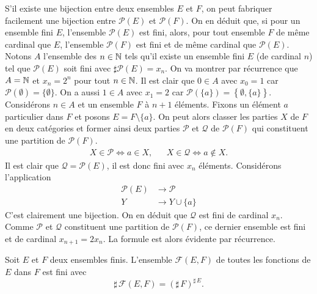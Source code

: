 \begin{demo}
 S'il existe une bijection entre deux ensembles $E$ et $F$, on peut fabriquer facilement une bijection entre $\mathcal{P}(E)$ et $\mathcal{P}(F)$. On en déduit que, si pour un ensemble fini $E$, l'ensemble $\mathcal{P}(E)$ est fini, alors, pour tout ensemble $F$ de même cardinal que $E$, l'ensemble $\mathcal{P}(F)$ est fini et de même cardinal que $\mathcal{P}(E)$.\newline
Notons $A$ l'ensemble des $n\in \mathbb{N}$ tels qu'il existe un ensemble fini $E$ (de cardinal $n$) tel que $\mathcal{P}(E)$ soit fini avec $\sharp \mathcal{P}(E) = x_n$.\newline
On va montrer par récurrence que $A=\mathbb{N}$ et $x_n=2^n$ pour tout $n\in \mathbb{N}$.\newline
Il est clair que $0\in A$ avec $x_0=1$ car $\mathcal{P}(\emptyset)=\{\emptyset\}$. On a aussi $1\in A$ avec $x_1=2$ car $\mathcal{P}(\{a\})=\left\lbrace \emptyset, \{a\}\right\rbrace$.\newline
Considérons $n\in A$ et un ensemble $F$ à $n+1$ éléments.\newline
Fixons un élément $a$ particulier dans $F$ et posons $E=F\setminus\{a\}$. On peut alors classer les parties $X$ de $F$ en deux catégories et former ainsi deux parties $\mathcal P$ et $\mathcal Q$ de $\mathcal P(F)$ qui constituent une partition de $\mathcal{P}(F)$.
\begin{align*}
 X\in \mathcal P \Leftrightarrow a \in X,  & & 
 X\in \mathcal Q \Leftrightarrow a \not\in X .
\end{align*}
Il est clair que $\mathcal{Q}=\mathcal{P}(E)$, il est donc fini avec $x_n$ éléments. Considérons l'application
\begin{displaymath}
 \begin{aligned}
  \mathcal{P}(E) &\rightarrow \mathcal P\\
  Y &\rightarrow Y\cup \{a\}
 \end{aligned}
\end{displaymath}
C'est clairement une bijection. On en déduit que $\mathcal Q$ est fini de cardinal $x_n$. Comme $\mathcal{P}$ et $\mathcal{Q}$ constituent une partition de $\mathcal{P}(F)$, ce dernier ensemble est fini et de cardinal $x_{n+1}=2x_n$. La formule est alors évidente par récurrence.
\end{demo}
\clearpage
{}
\begin{propn}
 Soit $E$ et $F$ deux ensembles finis. L'ensemble $\mathcal F(E,F)$ de toutes les fonctions de $E$ dans $F$ est fini avec
\begin{displaymath}
 \sharp\,\mathcal F(E,F) = (\sharp \, F)^{\sharp\, E}.
\end{displaymath}
\end{propn}

